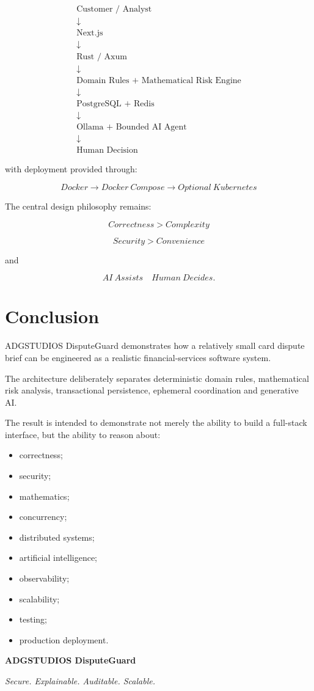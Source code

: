 \documentclass[11pt,a4paper]{article}
\begin{document}
\[
\boxed{
\begin{array}{c}
\text{Customer / Analyst} \\[3pt]
\downarrow \\[3pt]
\text{Next.js} \\[3pt]
\downarrow \\[3pt]
\text{Rust / Axum} \\[3pt]
\downarrow \\[3pt]
\text{Domain Rules + Mathematical Risk Engine} \\[3pt]
\downarrow \\[3pt]
\text{PostgreSQL + Redis} \\[3pt]
\downarrow \\[3pt]
\text{Ollama + Bounded AI Agent} \\[3pt]
\downarrow \\[3pt]
\text{Human Decision}
\end{array}
}
\]

with deployment provided through:

\[
\boxed{
Docker
\rightarrow
Docker\ Compose
\rightarrow
Optional\ Kubernetes
}
\]

The central design philosophy remains:

\[
\boxed{
Correctness
>
Complexity
}
\]

\[
\boxed{
Security
>
Convenience
}
\]

and

\[
\boxed{
AI\ Assists
\quad
Human\ Decides.
}
\]

\section{Conclusion}

ADGSTUDIOS DisputeGuard demonstrates how a relatively small card
dispute brief can be engineered as a realistic financial-services
software system.

The architecture deliberately separates deterministic domain rules,
mathematical risk analysis, transactional persistence, ephemeral
coordination and generative AI.

The result is intended to demonstrate not merely the ability to build
a full-stack interface, but the ability to reason about:

\begin{itemize}
    \item correctness;
    \item security;
    \item mathematics;
    \item concurrency;
    \item distributed systems;
    \item artificial intelligence;
    \item observability;
    \item scalability;
    \item testing;
    \item production deployment.
\end{itemize}

\begin{center}
\vspace{1cm}
\textbf{\Large ADGSTUDIOS DisputeGuard}

\vspace{0.3cm}

\textit{Secure. Explainable. Auditable. Scalable.}
\end{center}
\end{document}
